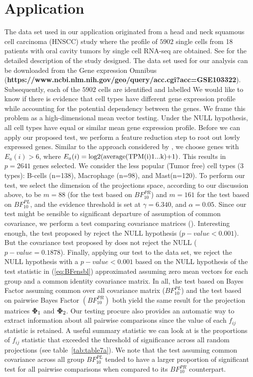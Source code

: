 \documentclass[times,sort&compress,3p]{elsarticle}
\theoremstyle{plain}%
\theoremstyle{definition}
\def\log{\hbox{log}}
\def\log{\hbox{log}}
\newcommand{\uPhi}              {\mbox{\boldmath$\Phi$}}
\begin{document}
\section{Application} \label{sec:Application}
The data set used in our application originated from a head and neck squamous cell carcinoma (HNSCC) study where the profile of $5902$ single cells from 18 patients with oral cavity tumors by single cell RNA-seq are obtained. See \citep{puram2017single} for the detailed description of the study designed. The data set used for our analysis can be downloaded from the Gene expression Omnibus (\textbf{https://www.ncbi.nlm.nih.gov/geo/query/acc.cgi?acc=GSE103322}). Subsequently, each of the $5902$ cells are identified and labelled %
We would like to know if there is evidence that cell types have different gene expression profile while accounting for the potential dependency between the genes. We frame this problem as a high-dimensional mean vector testing. Under the NULL hypothesis, all cell types have equal or similar mean gene expression profile. Before we can apply our proposed test, we perform a feature reduction step to root out lowly expressed genes. Similar to the approach considered by \cite{puram2017single}, we choose genes with $E_a(i) > 6$, where $E_a(i)=\log2\text{(average(TPM(i)1...k)+1)}$. This results in $p = 2641$ genes selected. We consider the less popular (Tumor free) cell types (3 types): B-cells (n=138),  Macrophage (n=98), and Mast(n=120). To perform our test, we select the dimension of the projections space, according to our discussion above, to be $m = 88$ (for the test based on $BF^{PR}_{10}$) and $m = 161$ for the test based on $BF^{PL}_{10}$, and the evidence threshold is set at $\gamma = 6.340$, and $\alpha = 0.05$. Since our test might be sensible to significant departure of assumption of common covariance, we perform a test comparing covariance matrices (\citealp{ahmad2017location,srivastava2010testing}). Interesting enough, the test proposed by \citealt{ahmad2017location} reject the NULL hypothesis ($p-value < 0.001$). But the covariance test proposed by \cite{srivastava2010testing} does not reject the NULL ($p-value = 0.1878$). 
Finally, applying our test to the data set, we reject the NULL hypothesis with a $p-value < 0.001$ based on the NULL hypothesis of the test statistic in (\ref{eq:BFensbl}) approximated assuming zero mean vectors for each group and a common identity covariance matrix. In all, the test based on Bayes Factor assuming common over all covariance matrix ($BF^{PL}_{10}$) and the test based on pairwise Bayes Factor $(BF^{PR}_{10})$ both yield the same result for the projection matrices $\uPhi_1$ and $\uPhi_2$. 
Our testing procure also provides an automatic way to extract information about all pairwise comparisons since the value of each $f_{ij}$ statistic is retained. A useful summary statistic we can look at is the proportions of $f_{ij}$ statistic that exceeded the threshold of significance across all random projections (see table~\ref{tab:table7a}). We note that the test assuming common covariance across all group $BF^{PL}_{10}$ tended to have a larger proportion of significant test for all pairwise comparisons when compared to its $BF^{PR}_{10}$ counterpart.  
\end{document}
